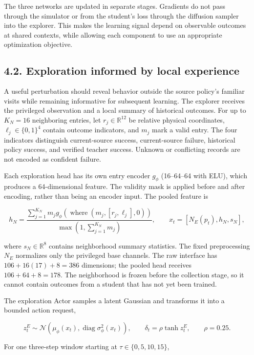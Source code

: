 \documentclass[
  american,
  11pt,
  a4paper,
]{article}
\begin{document}
The three networks are updated in separate stages. Gradients do not pass
through the simulator or from the student's loss through the diffusion
sampler into the explorer. This makes the learning signal depend on
observable outcomes at shared contexts, while allowing each component to
use an appropriate optimization objective.

\subsection{4.2. Exploration informed by local
experience}\label{exploration-informed-by-local-experience}

A useful perturbation should reveal behavior outside the source policy's
familiar visits while remaining informative for subsequent learning. The
explorer receives the privileged observation and a local summary of
historical outcomes. For up to \(K_N=16\) neighboring entries, let
\(r_j\in\mathbb R^{12}\) be relative physical coordinates,
\(\ell_j\in\{0,1\}^4\) contain outcome indicators, and \(m_j\) mark a
valid entry. The four indicators distinguish current-source success,
current-source failure, historical policy success, and verified teacher
success. Unknown or conflicting records are not encoded as confident
failure.

Each exploration head has its own entry encoder \(g_\phi\) (16--64--64
with ELU), which produces a 64-dimensional feature. The validity mask is
applied before and after encoding, rather than being an encoder input.
The pooled feature is

\[
h_N=\frac{\sum_{j=1}^{K_N}m_jg_\phi(\operatorname{where}(m_j,[r_j,\ell_j],0))}
{\max(1,\sum_{j=1}^{K_N}m_j)},\qquad
x_t=[N_E(p_t),h_N,s_N],
\tag{8}\label{eq:8}
\]

where \(s_N\in\mathbb R^8\) contains neighborhood summary statistics.
The fixed preprocessing \(N_E\) normalizes only the privileged base
channels. The raw interface has \(106+16(17)+8=386\) dimensions; the
pooled head receives \(106+64+8=178\). The neighborhood is frozen before
the collection stage, so it cannot contain outcomes from a student that
has not yet been trained.

The exploration Actor samples a latent Gaussian and transforms it into a
bounded action request,

\[
z_t^E\sim\mathcal N(\mu_\phi(x_t),\operatorname{diag}\sigma_\phi^2(x_t)),
\qquad \delta_t=\rho\tanh z_t^E,\qquad \rho=0.25.
\tag{9}\label{eq:9}
\]

For one three-step window starting at \(\tau\in\{0,5,10,15\}\),
\end{document}
